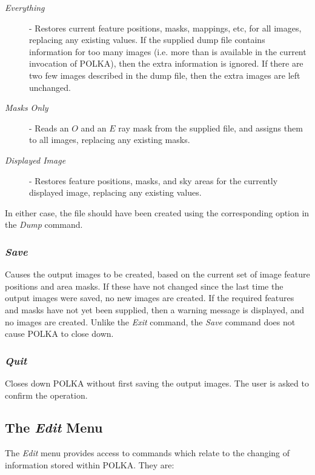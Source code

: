\documentclass[11pt]{article}
\newcommand{\htmlref}[2]{#1}
\newcommand{\xlabel}[1]{}
\newcommand{\mylabel}[1] {\xlabel{#1}\label{#1}}
\begin{document}
\begin{description}

\item [\emph{Everything}] - Restores current feature positions, masks,
mappings, etc, for all images, replacing any existing values. If the
supplied dump file contains information for too many images (i.e. more
than is available in the current invocation of POLKA), then the extra
information is ignored. If there are two few images described in the dump
file, then the extra images are left unchanged.

\item [\emph{Masks Only}] - Reads an $O$ and an $E$ ray mask from the supplied
file, and assigns them to all images, replacing any existing masks.

\item [\emph{Displayed Image}] - Restores feature positions, masks, and
sky areas for the currently displayed image, replacing any existing values.

\end{description}

In either case, the file should have been created using the
corresponding option in the \htmlref{\emph{Dump}}{POLKA_DUMP} command.

\subsubsection {\mylabel{POLKA_SAVE}\emph{Save}} Causes the output images to be
created, based on the current set of image feature positions and area masks. If
these have not changed since the last time the output images were saved,
no new images are created. If the required features and masks have not
yet been supplied, then a warning message is displayed, and no images are
created. Unlike the \emph{Exit} command, the \emph{Save} command does not
cause POLKA to close down.

\subsubsection {\mylabel{POLKA_QUIT}\emph{Quit}} Closes down POLKA without first saving the output
images. The user is asked to confirm the operation.

\subsection {\mylabel{POLKA_EDIT_MENU}The \emph{Edit} Menu}
The \emph{Edit} menu provides access to commands which relate to
the changing of information stored within POLKA. They are:
\end{document}
